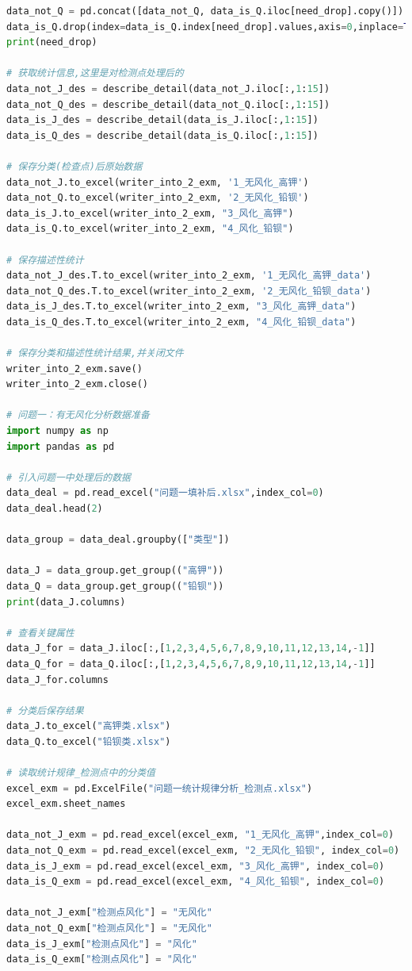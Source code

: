 \documentclass[withoutpreface,bwprint]{cumcmthesis} %
\begin{document}
\begin{appendices}
\begin{lstlisting}[language=python]
data_not_Q = pd.concat([data_not_Q, data_is_Q.iloc[need_drop].copy()])
data_is_Q.drop(index=data_is_Q.index[need_drop].values,axis=0,inplace=True)
print(need_drop)

# 获取统计信息,这里是对检测点处理后的
data_not_J_des = describe_detail(data_not_J.iloc[:,1:15])
data_not_Q_des = describe_detail(data_not_Q.iloc[:,1:15])
data_is_J_des = describe_detail(data_is_J.iloc[:,1:15])
data_is_Q_des = describe_detail(data_is_Q.iloc[:,1:15])

# 保存分类(检查点)后原始数据
data_not_J.to_excel(writer_into_2_exm, '1_无风化_高钾')
data_not_Q.to_excel(writer_into_2_exm, '2_无风化_铅钡')
data_is_J.to_excel(writer_into_2_exm, "3_风化_高钾")
data_is_Q.to_excel(writer_into_2_exm, "4_风化_铅钡")

# 保存描述性统计
data_not_J_des.T.to_excel(writer_into_2_exm, '1_无风化_高钾_data')
data_not_Q_des.T.to_excel(writer_into_2_exm, '2_无风化_铅钡_data')
data_is_J_des.T.to_excel(writer_into_2_exm, "3_风化_高钾_data")
data_is_Q_des.T.to_excel(writer_into_2_exm, "4_风化_铅钡_data")

# 保存分类和描述性统计结果,并关闭文件
writer_into_2_exm.save()
writer_into_2_exm.close()

# 问题一：有无风化分析数据准备
import numpy as np
import pandas as pd

# 引入问题一中处理后的数据
data_deal = pd.read_excel("问题一填补后.xlsx",index_col=0)
data_deal.head(2)

data_group = data_deal.groupby(["类型"])

data_J = data_group.get_group(("高钾"))
data_Q = data_group.get_group(("铅钡"))
print(data_J.columns)

# 查看关键属性
data_J_for = data_J.iloc[:,[1,2,3,4,5,6,7,8,9,10,11,12,13,14,-1]]
data_Q_for = data_Q.iloc[:,[1,2,3,4,5,6,7,8,9,10,11,12,13,14,-1]]
data_J_for.columns

# 分类后保存结果
data_J.to_excel("高钾类.xlsx")
data_Q.to_excel("铅钡类.xlsx")

# 读取统计规律_检测点中的分类值
excel_exm = pd.ExcelFile("问题一统计规律分析_检测点.xlsx")
excel_exm.sheet_names

data_not_J_exm = pd.read_excel(excel_exm, "1_无风化_高钾",index_col=0)
data_not_Q_exm = pd.read_excel(excel_exm, "2_无风化_铅钡", index_col=0)
data_is_J_exm = pd.read_excel(excel_exm, "3_风化_高钾", index_col=0)
data_is_Q_exm = pd.read_excel(excel_exm, "4_风化_铅钡", index_col=0)

data_not_J_exm["检测点风化"] = "无风化"
data_not_Q_exm["检测点风化"] = "无风化"
data_is_J_exm["检测点风化"] = "风化"
data_is_Q_exm["检测点风化"] = "风化"


\end{lstlisting}
\end{appendices}
\end{document}

